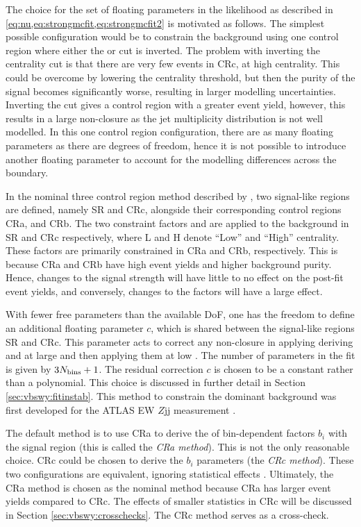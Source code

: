 The choice for the set of floating parameters in the likelihood as described in \cref{eq:nu,eq:strongmcfit,eq:strongmcfit2} is motivated as follows. The simplest possible configuration would be to constrain the background using one control region where either the \ngapjets or \xily cut is inverted. The problem with inverting the centrality cut is that there are very few events in CRc, at high centrality. This could be overcome by lowering the centrality threshold, but then the purity of the \ewwy signal becomes significantly worse, resulting in larger modelling uncertainties. Inverting the \Ngapjets cut gives a control region with a greater event yield, however, this results in a large non-closure as the jet multiplicity distribution is not well modelled. In this one control region configuration, there are as many floating parameters as there are degrees of freedom, hence it is not possible to introduce another floating parameter to account for the modelling differences across the \ngapjets boundary. 

In the nominal three control region method described by , two signal-like regions are defined, namely SR and CRc, alongside their corresponding control regions CRa, and CRb. The two constraint factors \bl and \bh are applied to the \qcdwy background in SR and CRc respectively, where L and H denote ``Low'' and ``High'' centrality. These factors are primarily constrained in CRa and CRb, respectively. This is because CRa and CRb have high event yields and higher background purity. Hence, changes to the signal strength will have little to no effect on the post-fit event yields, and conversely, changes to the \bi factors will have a large effect. 

With fewer free parameters than the available DoF, one has the freedom to define an additional floating parameter $c$, which is shared between the signal-like regions SR and CRc. This parameter acts to correct any non-closure in applying deriving \bl and \bh at large \ngapjets and then applying them at low \ngapjets. The number of parameters in the fit is given by $3N_{\text{bins}}+1$. The residual correction $c$ is chosen to be a constant rather than a polynomial. This choice is discussed in further detail in Section \ref{sec:vbswy:fitinstab}.
This method to constrain the dominant background was first developed for the ATLAS EW $Z$jj measurement \cite{VBSWy:VBFZ}. 

The default method is to use CRa to derive the of bin-dependent factors $b_i$ with the signal region (this is called the \textit{CRa method}). This is not the only reasonable choice. CRc could be chosen to derive the $b_i$ parameters (the \textit{CRc method}). These two configurations are equivalent, ignoring statistical effects \cite{VBSWy:VBFZ}. Ultimately, the CRa method is chosen as the nominal method because CRa has larger event yields compared to CRc. The effects of smaller statistics in CRc will be discussed in Section \ref{sec:vbswy:crosschecks}. The CRc method serves as a cross-check.


